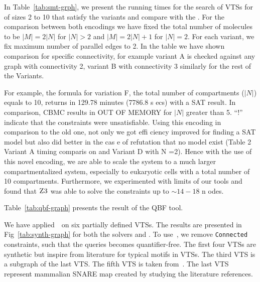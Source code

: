 

In Table~\ref{tab:smt-grph}, we present the running times for the search of
VTSs for {\smttool} of sizes 2 to 10 that satisfy the variants and compare with the {\sattool}.
%
For the comparison between both encodings we have fixed the total
number of molecules to be $|M| = 2|N|$ for $ |N|> 2$ and $|M| = 2|N| + 1$ for $|N| = 2$.
%
For each variant, we fix maximum number of parallel
edges to 2.
%
In the table we have shown comparison for specific connectivity, for
example variant A is checked against any graph with connectivity 2,
variant B with connectivity 3 similarly for the rest of the Variants.
%

%
For example, the formula for variation F, the total number of
compartments ($|N|$) equals to 10, returns in 129.78 minutes (7786.8 s
ecs)
with a SAT result.
%
In comparison, CBMC results in OUT OF MEMORY for $|N|$ greater than 5.
%
``!'' indicate that the constraints were unsatisfiable.
%
Using this encoding in comparison to the old one, not only we got effi
ciency improved for finding a SAT model but also did better in the cas
e of refutation that no model exist (Table 2 Variant A timing comparis
on and Variant D with N =2). 
%
Hence with the use of this novel encoding, we are able to scale the system to a much larger compartmentalized system, especially to
eukaryotic cells with a total number of 10 compartments.
%
Furthermore, we experimented with limits of our tools and found
that $\textsc{Z3}$ was able to solve the constraints up to $\sim{14-18}$ n
odes.


Table~\ref{tab:qbf-graph} presents the result of the QBF tool.


We have applied~\ourtool~on six partially defined VTSs.
%
The results are presented in Fig~\ref{tab:synth-graph} for both the solvers
\depqbf and \zthree.
%
To use~\zthree, we remove \texttt{Connected} constraints, such that the queries becomes
quantifier-free.
%
%
%
The first four VTSs are synthetic but inspire from literature for
typical motifs in VTSs. 
The third VTS is a subgraph of the last VTS.
%
%
The fifth VTS is taken from~\cite{burri2004complete}.
%
The last VTS represent mammalian SNARE map created by studying the literature references.  


